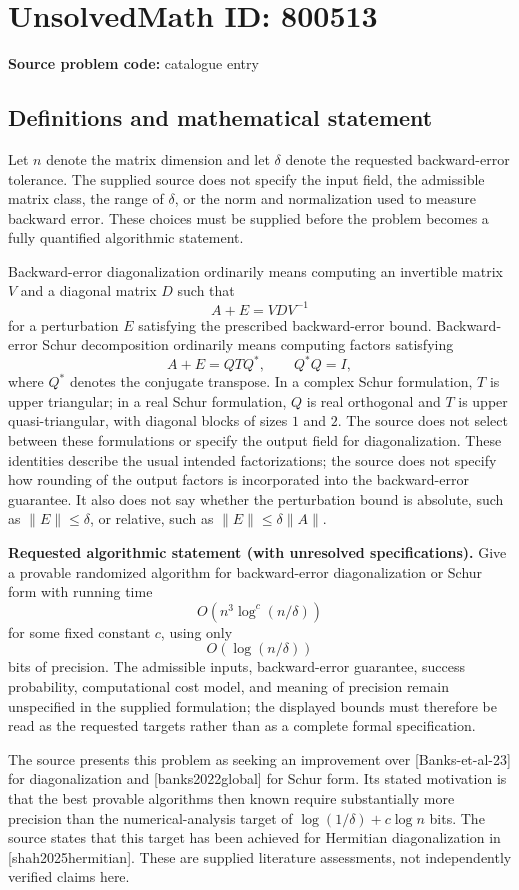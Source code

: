 \documentclass[11pt]{article}
\begin{document}
\section*{UnsolvedMath ID: 800513}
\textbf{Source problem code:} catalogue entry
\subsection{Definitions and mathematical statement}
Let \(n\) denote the matrix dimension and let \(\delta\) denote the requested backward-error tolerance. The supplied source does not specify the input field, the admissible matrix class, the range of \(\delta\), or the norm and normalization used to measure backward error. These choices must be supplied before the problem becomes a fully quantified algorithmic statement.

Backward-error diagonalization ordinarily means computing an invertible matrix \(V\) and a diagonal matrix \(D\) such that
\[
A+E=VDV^{-1}
\]
for a perturbation \(E\) satisfying the prescribed backward-error bound. Backward-error Schur decomposition ordinarily means computing factors satisfying
\[
A+E=QTQ^*,\qquad Q^*Q=I,
\]
where \(Q^*\) denotes the conjugate transpose. In a complex Schur formulation, \(T\) is upper triangular; in a real Schur formulation, \(Q\) is real orthogonal and \(T\) is upper quasi-triangular, with diagonal blocks of sizes \(1\) and \(2\). The source does not select between these formulations or specify the output field for diagonalization. These identities describe the usual intended factorizations; the source does not specify how rounding of the output factors is incorporated into the backward-error guarantee. It also does not say whether the perturbation bound is absolute, such as \(\lVert E\rVert\leq\delta\), or relative, such as \(\lVert E\rVert\leq\delta\lVert A\rVert\).

\textbf{Requested algorithmic statement (with unresolved specifications).} Give a provable randomized algorithm for backward-error diagonalization or Schur form with running time
\[
O\!\left(n^3\log^c(n/\delta)\right)
\]
for some fixed constant \(c\), using only
\[
O\!\left(\log(n/\delta)\right)
\]
bits of precision. The admissible inputs, backward-error guarantee, success probability, computational cost model, and meaning of precision remain unspecified in the supplied formulation; the displayed bounds must therefore be read as the requested targets rather than as a complete formal specification.

The source presents this problem as seeking an improvement over [Banks-et-al-23] for diagonalization and [banks2022global] for Schur form. Its stated motivation is that the best provable algorithms then known require substantially more precision than the numerical-analysis target of \(\log(1/\delta)+c\log n\) bits. The source states that this target has been achieved for Hermitian diagonalization in [shah2025hermitian]. These are supplied literature assessments, not independently verified claims here.
\end{document}
